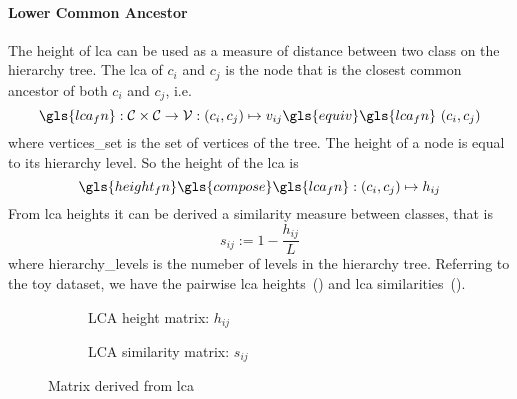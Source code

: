 \paragraph{Lower Common Ancestor}
The height of \acrfull{lca} can be used as a measure of distance between two class on the hierarchy tree. The \acrshort{lca} of $c_i$ and $c_j$ is the node that is the closest common ancestor of both $c_i$ and $c_j$, i.e.\
\begin{equation}
  \gls{lca_fn} : \mathcal{C} \times \mathcal{C} \to \mathcal{V}:
  \left(c_i, c_j\right) \mapsto v_{ij} \gls{equiv}
  \gls{lca_fn} \, \left(c_i, c_j\right)
  \label{eq:lca}
\end{equation}
where \gls{vertices_set} is the set of vertices of the tree. The height of a node is equal to its hierarchy level.
So the height of the \acrshort{lca} is
\begin{equation}
  \gls{height_fn} \gls{compose} \gls{lca_fn} : \left(c_i, c_j\right) \mapsto h_{ij}
  \label{eq:lca-height}
\end{equation}
From \acrshort{lca} heights it can be derived a similarity measure between classes, that is
\begin{equation}
  s_{ij} := 1 - \frac{h_{ij}}{L}
\end{equation}
where \gls{hierarchy_levels} is the numeber of levels in the hierarchy tree.
Referring to the toy dataset, we have the pairwise \acrshort{lca} heights~() and \acrshort{lca} similarities~().
\begin{figure}[htbp]
  \begin{subfigure}{0.45\textwidth}
    \caption{LCA height matrix: $h_{ij}$}
    \label{fig:03/lca-height-matrix}
  \end{subfigure}
  \begin{subfigure}{0.45\textwidth}
    \caption{LCA similarity matrix: $s_{ij}$}
    \label{fig:03/lca-similarity-matrix}
  \end{subfigure}
  \caption{Matrix derived from \acrlong{lca}}
\end{figure}

